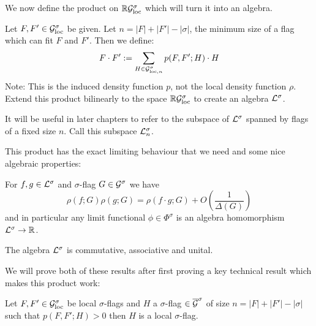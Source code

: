We now define the product on $\mathbb{R}\mathcal{G}_\mathrm{loc}^\sigma$ which will turn it into an algebra.

\begin{definition}
    Let $F, F'\in\mathcal{G}_\mathrm{loc}^\sigma$ be given. Let $n=|F|+|F'|-|\sigma|$, the minimum size of
    a flag which can fit $F$ and $F'$. Then we define:
    \[
        F \cdot F' := \sum_{H \in \mathcal{G}_{\mathrm{loc},n}^\sigma} p(F, F'; H) \cdot H
    \]
    Note: This is the induced density function $p$, not the local density function $\rho$.
    Extend this product bilinearly to the space $\mathbb{R}\mathcal{G}_\mathrm{loc}^\sigma$ to create an algebra
    $\mathcal{L}^\sigma$.
\end{definition}

\begin{note}
    It will be useful in later chapters to refer to the subspace of $\mathcal{L}^\sigma$
    spanned by flags of a fixed size $n$. Call this subspace $\mathcal{L}^\sigma_n$.
\end{note}

This product has the exact limiting behaviour that we need and some nice algebraic
properties:

\begin{theorem}
    \label{thm:local_product_lim}
    For $f, g \in \mathcal{L}^\sigma$ and $\sigma$-flag $G\in\mathcal{G}^\sigma$ we have
    \[\rho(f; G)\rho(g; G) = \rho(f\cdot g; G) + O\left(\frac{1}{\Delta(G)}\right)\]
    and in particular any limit functional $\phi\in\Phi^\sigma$ is an algebra
    homomorphism $\mathcal{L}^\sigma \to \mathbb{R}$.
\end{theorem}

\begin{lemma}
    \label{lemma:local_assoc}
    The algebra $\mathcal{L}^\sigma$ is commutative, associative and unital.
\end{lemma}

We will prove both of these results after first proving a key technical result which makes this
product work:

\begin{theorem}
    Let $F, F' \in \mathcal{G}_\mathrm{loc}^\sigma$ be local $\sigma$-flags and $H$ a $\sigma$-flag
    $\in \overline{\mathcal{G}}^\sigma$
    of size $n=|F|+|F'|-|\sigma|$ such that $p(F, F'; H) > 0$ then $H$ is a local
    $\sigma$-flag.
\end{theorem}

